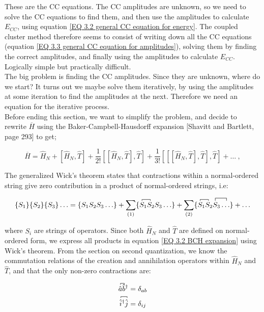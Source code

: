 \documentclass[10pt]{report}
\begin{document}
	These are the CC equations. The CC amplitudes are unknown, so we need to solve the CC equations to find them, and then use the amplitudes to calculate $E_{CC}$, using equation \ref{EQ 3.2 general CC equation for energy}. The coupled cluster method therefore seems to consist of writing down all the CC equations (equation \ref{EQ 3.3 general CC equation for amplitudes}), solving them by finding the correct amplitudes, and finally using the amplitudes to calculate $E_{CC}$. Logically simple but practically difficult.\\
	The big problem is finding the CC amplitudes. Since they are unknown, where do we start? It turns out we maybe solve them iteratively, by using the amplitudes at some iteration to find the amplitudes at the next. Therefore we need an equation for the iterative process.\\
	
	Before ending this section, we want to simplify the problem, and decide to rewrite $\overbar{H}$ using the Baker-Campbell-Hausdorff expansion [Shavitt and Bartlett, page 293] to get;
	
	\begin{equation}
		\overbar{H} = \hat{H}_N + \left[ \hat{H}_N,\hat{T} \right] + \frac{1}{2!}\left[\left[ \hat{H}_N,\hat{T} \right],\hat{T}\right] + \frac{1}{3!}\left[\left[ \left[\hat{H}_N,\hat{T} \right],\hat{T}\right],\hat{T}\right] + \ldots\:,
		\label{EQ 3.2 BCH expansion}
	\end{equation}
	
	The generalized Wick's theorem states that contractions within a normal-ordered string give zero contribution in a product of normal-ordered strings, i.e:
	
	\begin{equation}
		\{S_1\}\{S_2\}\{S_3\}\ldots = \{S_1S_2S_3\ldots\} + \sum_{\text{(1)}}\{\contraction[2pt]{}{S}{{}_1}{S}S_1S_2S_3\ldots\} + \sum_{\text{(2)}}\{\contraction[4pt]{S_1S_2}{S}{{}_3}{\ldots}\contraction[2pt]{}{S}{{}_1}{S}S_1S_2S_3\ldots\} + \ldots
	\end{equation}
	
	where $S_i$ are strings of operators. Since both $\hat{H}_N$ and $\hat{T}$ are defined on normal-ordered form, we express all products in equation \ref{EQ 3.2 BCH expansion} using Wick's theorem. From the section on second quantization, we know the commutation relations of the creation and annihilation operators within $\hat{H}_N$ and $\hat{T}$, and that the only non-zero contractions are:
	
	\begin{align}
		\contraction[2pt]{}{\hat{a}}{}{\hat{b}}\hat{a}\hat{b}^\dagger &= \delta_{ab}\\
		\contraction[2pt]{}{\hat{i}}{{}^\dagger}{\hat{j}}\hat{i}^\dagger\hat{j} &= \delta_{ij}
	\end{align}
	
\end{document}
